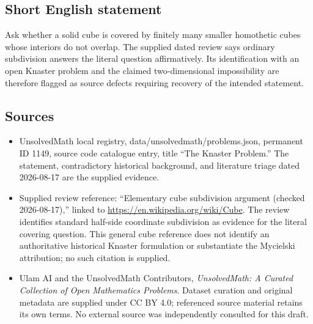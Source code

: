 \documentclass[11pt]{article}
\begin{document}
\subsection{Short English statement}
Ask whether a solid cube is covered by finitely many smaller homothetic cubes whose interiors do not overlap. The supplied dated review says ordinary subdivision answers the literal question affirmatively. Its identification with an open Knaster problem and the claimed two-dimensional impossibility are therefore flagged as source defects requiring recovery of the intended statement.
\subsection{Sources}
\begin{itemize}
\item UnsolvedMath local registry, data/unsolvedmath/problems.json, permanent ID 1149, source code catalogue entry, title ``The Knaster Problem.'' The statement, contradictory historical background, and literature triage dated 2026-08-17 are the supplied evidence.
\item Supplied review reference: ``Elementary cube subdivision argument (checked 2026-08-17),'' linked to \url{https://en.wikipedia.org/wiki/Cube}. The review identifies standard half-side coordinate subdivision as evidence for the literal covering question. This general cube reference does not identify an authoritative historical Knaster formulation or substantiate the Mycielski attribution; no such citation is supplied.
\item Ulam AI and the UnsolvedMath Contributors, \emph{UnsolvedMath: A Curated Collection of Open Mathematics Problems}. Dataset curation and original metadata are supplied under CC BY 4.0; referenced source material retains its own terms. No external source was independently consulted for this draft.
\end{itemize}
\end{document}
